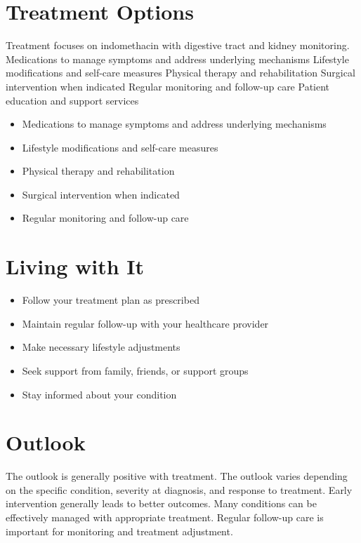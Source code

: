 \section{Treatment Options}
Treatment focuses on indomethacin with digestive tract and kidney monitoring. Medications to manage symptoms and address underlying mechanisms Lifestyle modifications and self-care measures Physical therapy and rehabilitation Surgical intervention when indicated Regular monitoring and follow-up care Patient education and support services

\begin{itemize}[noitemsep]
  \item Medications to manage symptoms and address underlying mechanisms
  \item Lifestyle modifications and self-care measures
  \item Physical therapy and rehabilitation
  \item Surgical intervention when indicated
  \item Regular monitoring and follow-up care
\end{itemize}
\section{Living with It}
\begin{itemize}[noitemsep]
  \item Follow your treatment plan as prescribed
  \item Maintain regular follow-up with your healthcare provider
  \item Make necessary lifestyle adjustments
  \item Seek support from family, friends, or support groups
  \item Stay informed about your condition
\end{itemize}
\section{Outlook}
The outlook is generally positive with treatment. The outlook varies depending on the specific condition, severity at diagnosis, and response to treatment. Early intervention generally leads to better outcomes. Many conditions can be effectively managed with appropriate treatment. Regular follow-up care is important for monitoring and treatment adjustment.
